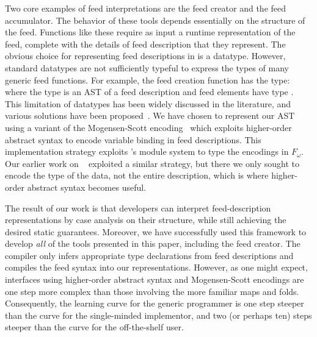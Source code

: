 Two core examples of feed interpretations are the feed creator and the
feed accumulator. The behavior of these tools depends
essentially on the structure of the feed.  Functions like these
require as input a runtime representation of the feed,
complete with the details of feed description that
they represent. The obvious choice for representing feed descriptions
in \ocaml is a datatype. However, standard \ocaml datatypes are not
sufficiently typeful to express the types of many generic feed
functions. For example, the feed creation function has the type:
 
where the type  is an AST of a feed description and feed 
elements have type .
%
%
This limitation of datatypes has been widely discussed in the
literature, and various solutions have been 
proposed~\cite{padsml-padl,xi:popl03,weirich:encodingtypecase,yang:icfp98}. We have 
chosen to represent our AST using a variant of the Mogensen-Scott
encoding~\cite{mogensen:jfp,wand98} which exploits higher-order abstract syntax 
to encode variable binding in feed descriptions.  This implementation strategy 
exploits \ocaml's module system to type the encodings in $F_\omega$. 
Our earlier work on \padsml~\cite{padsml-padl} 
exploited a similar strategy,
but there we only sought to encode the \ocaml{} type of the data, not
the entire \padsml{} description, which is where higher-order abstract
syntax becomes useful.


The result of our work is that developers
can interpret feed-description representations by case analysis on
their structure, while still achieving the desired static
guarantees. Moreover, we have successfully used this framework to
develop {\it all} of the tools presented in this paper, including the
feed creator. The compiler only infers appropriate
type declarations from feed descriptions and compiles the feed syntax
into our representations.  However, as one might expect, interfaces using
higher-order abstract syntax and Mogensen-Scott encodings are one step more
complex than those involving the more familiar maps and folds.  Consequently, the
learning curve for the generic programmer is one step steeper than
the curve for the single-minded implementor, and two (or perhaps ten) steps steeper
than the curve for the off-the-shelf user.

